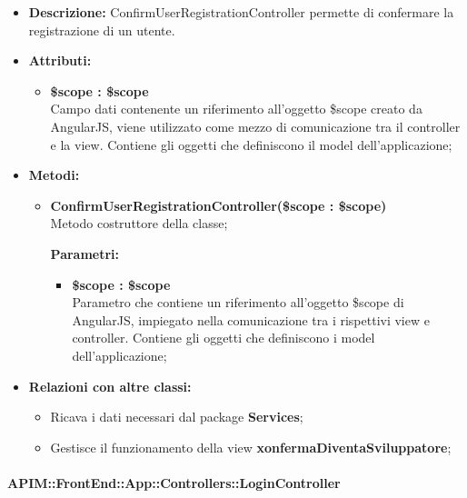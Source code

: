 \begin{itemize}
	\item \textbf{Descrizione:} ConfirmUserRegistrationController permette di confermare la registrazione di un utente.
	\item \textbf{Attributi:}
	\begin{itemize}
		
		\item \textbf{\$scope : \$scope}\\
		Campo dati contenente un riferimento all'oggetto \$scope creato da AngularJS, viene utilizzato come mezzo di comunicazione tra il controller e la view. Contiene gli oggetti che definiscono il model dell'applicazione;
		
	\end{itemize}
	\item \textbf{Metodi:}
	\begin{itemize}
		
		\item \textbf{ConfirmUserRegistrationController(\$scope : \$scope)}\\
		Metodo costruttore della classe;
		\begin{description}
			\item[\textbf{Parametri:}]
		\end{description}
		\begin{itemize}
			\item \textbf{\$scope : \$scope}\\
			Parametro che contiene un riferimento all'oggetto \$scope di AngularJS, impiegato nella comunicazione tra i rispettivi view e controller. Contiene gli oggetti che definiscono i model dell'applicazione;
			
		\end{itemize}		
		
	\end{itemize}
	\item \textbf{Relazioni con altre classi:}
	\begin{itemize}
		\item Ricava i dati necessari dal package \textbf{Services};
		\item Gestisce il funzionamento della view \textbf{xonfermaDiventaSviluppatore};
	\end{itemize}
\end{itemize}

\paragraph{APIM::FrontEnd::App::Controllers::LoginController}


